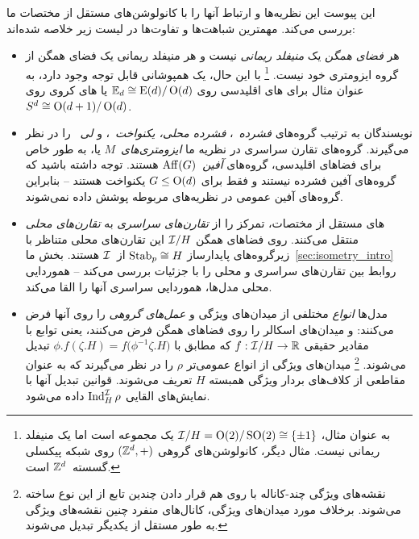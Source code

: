 این پیوست این نظریه‌ها و ارتباط آنها را با کانولوشن‌های مستقل از مختصات ما بررسی می‌کند.
مهمترین شباهت‌ها و تفاوت‌ها در لیست زیر خلاصه شده‌اند:
\begin{itemize}
	\item[{\rule[2.2pt]{2pt}{2pt}}]
	هر \emph{فضای همگن} یک \emph{منیفلد ریمانی} نیست و هر منیفلد ریمانی یک فضای همگن از گروه ایزومتری خود نیست.%
	\footnote{
		به عنوان مثال، $\mathcal{I}/H = \operatorname{O}(2)/\operatorname{SO}(2) \cong \{\pm1\}$ یک مجموعه است اما یک منیفلد ریمانی نیست.
		مثال دیگر، کانولوشن‌های گروهی $(\mathbb{Z}^d,+)$ روی شبکه پیکسلی گسسته~$\mathbb{Z}^d$ است.
	}
	با این حال، یک همپوشانی قابل توجه وجود دارد، به عنوان مثال برای های اقلیدسی روی $\mathbb{E}_d \cong \operatorname{E}(d)/\operatorname{O}(d)$ یا های کروی روی $S^d \cong \operatorname{O}(d+1)/\operatorname{O}(d)$.
	\item[{\rule[2.2pt]{2pt}{2pt}}]
	نویسندگان به ترتیب گروه‌های \emph{فشرده}~\cite{Kondor2018-GENERAL}، \emph{فشرده محلی، یکنواخت}~\cite{Cohen2018-intertwiners}\cite{Cohen2019-generaltheory}، و \emph{لی}~\cite{bekkers2020bspline} را در نظر می‌گیرند.
	گروه‌های تقارن سراسری در نظریه ما \emph{ایزومتری‌های}~$M$ یا، به طور خاص برای فضاهای اقلیدسی، گروه‌های \emph{آفين}~$\operatorname{Aff}(G)$ هستند.
	توجه داشته باشید که گروه‌های آفين فشرده نیستند و فقط برای $G\leq\operatorname{O}(d)$ یکنواخت هستند -- بنابراین گروه‌های آفين عمومی در نظریه‌های مربوطه پوشش داده نمی‌شوند.
	\item[{\rule[2.2pt]{2pt}{2pt}}]
	های مستقل از مختصات، تمرکز را از \emph{تقارن‌های سراسری} به \emph{تقارن‌های محلی} منتقل می‌کنند.
	روی فضاهای همگن $\mathcal{I}/H$ این تقارن‌های محلی متناظر با زیرگروه‌های پایدارساز $\operatorname{Stab}_{p} \cong H$ از~$\mathcal{I}$ هستند.
	بخش ما~\ref{sec:isometry_intro} روابط بین تقارن‌های سراسری و محلی را با جزئیات بررسی می‌کند --
	هموردایی محلی مدل‌ها، هموردایی سراسری آنها را القا می‌کند.
	\item[{\rule[2.2pt]{2pt}{2pt}}]
	مدل‌ها \emph{انواع} مختلفی از میدان‌های ویژگی و \emph{عمل‌های گروهی} را روی آنها فرض می‌کنند:
	\citet{Kondor2018-GENERAL} و \citet{bekkers2020bspline} میدان‌های اسکالر را روی فضاهای همگن فرض می‌کنند، یعنی توابع با مقادیر حقیقی ${f: \mathcal{I}/H \to \mathbb{R}}$ که مطابق با
	$\phi.f (\zeta.H) = f\big( \phi^{-1} \zeta.H \big)$ تبدیل می‌شوند.%
	\footnote{
		نقشه‌های ویژگی چند-کاناله با روی هم قرار دادن چندین تابع از این نوع ساخته می‌شوند.
		برخلاف مورد میدان‌های ویژگی، کانال‌های منفرد چنین نقشه‌های ویژگی به طور مستقل از یکدیگر تبدیل می‌شوند.
	}
	\citet{Cohen2018-intertwiners}\cite{Cohen2019-generaltheory} میدان‌های ویژگی از انواع عمومی‌تر $\rho$ را در نظر می‌گیرند
	که به عنوان مقاطعی از کلاف‌های بردار ویژگی همبسته $H$ تعریف می‌شوند.
	قوانین تبدیل آنها با نمایش‌های القایی $\operatorname{Ind}_H^{\mathcal{I}} \rho$ داده می‌شود.

\end{itemize}
